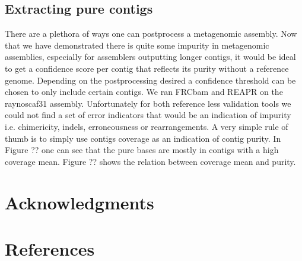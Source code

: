 \subsection*{Extracting pure contigs}
There are a plethora of ways one can postprocess a metagenomic assembly. Now
that we have demonstrated there is quite some impurity in metagenomic
assemblies, especially for assemblers outputting longer contigs, it would be
ideal to get a confidence score per contig that reflects its purity without a
reference genome. Depending on the postprocessing desired a confidence
threshold can be chosen to only include certain contigs. We ran FRCbam and
REAPR on the raynoscaf31 assembly. Unfortunately for both reference less
validation tools we could not find a set of error indicators that would be an
indication of impurity i.e. chimericity, indels, erroneousness or
rearrangements. A very simple rule of thumb is to simply use contigs coverage
as an indication of contig purity. In Figure ?? one can see that the pure bases
are mostly in contigs with a high coverage mean. Figure ?? shows the relation
between coverage mean and purity.




\section*{Acknowledgments}


\section*{References}

%
%
% 


